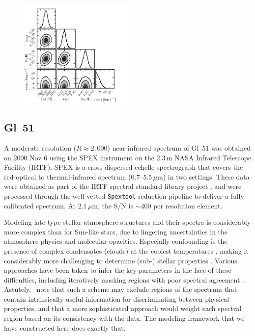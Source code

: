 \documentclass[iop,floatfix,numberedappendix,twocolappendix]{emulateapj}
\begin{document}
\begin{figure}[!b]
  \includegraphics[width=0.5\textwidth]{Gl51_triangle.pdf}
\end{figure}

\subsection{Gl~51}

A moderate resolution ($R\approx2,000$) near-infrared spectrum of Gl~51 was obtained on 2000 
Nov 6 using the SPEX instrument \citep{rayner03} on the 2.3\,m NASA Infrared Telescope Facility 
(IRTF).  SPEX is a cross-dispersed echelle spectrograph that covers the red-optical to 
thermal-infrared spectrum (0.7--5.5\,$\mu$m) in two settings.  These data were obtained as part of 
the IRTF spectral standard library project \citep{cushing05,rayner09}, and were processed through 
the well-vetted {\tt Spextool} reduction pipeline \citep{cushing04,vacca03} to deliver a fully 
calibrated spectrum.  At 2.1\,$\mu$m, the S/N is $\sim$400 per resolution element.

Modeling late-type stellar atmosphere structures and their spectra is considerably more complex 
than for Sun-like stars, due to lingering uncertainties in the atmosphere physics and molecular 
opacities.  Especially confounding is the presence of complex condensates (clouds) at the coolest 
temperatures \citep{allard13}, making it considerably more challenging to determine (sub-) stellar 
properties \citep{rajpurohit14}.  Various approaches have been taken to infer the key parameters in 
the face of these difficulties, including iteratively masking regions with poor spectral agreement 
\citep[e.g.,][]{mann13}.  Astutely, \citeauthor{mann13}~note that such a scheme may exclude 
regions of the spectrum that contain intrinsically useful information for discriminating between 
physical properties, and that a more sophisticated approach would weight each spectral region based 
on its consistency with the data.  The modeling framework that we have constructed here does 
exactly that.
\end{document}
